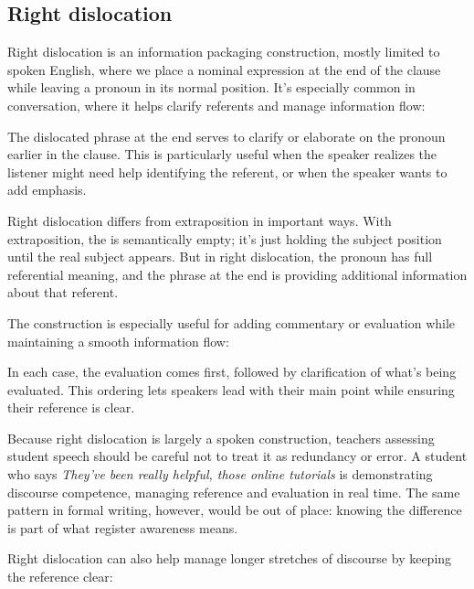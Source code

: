 \subsection{Right dislocation} \label{sec:right-dislocation}

Right dislocation is an information packaging construction, mostly limited to spoken English, where we place a nominal expression at the end of the clause while leaving a pronoun in its normal position. It's especially common in conversation, where it helps clarify referents and manage information flow:

\ea\label{ex:right-dis-basic}
   \z
\z
The dislocated phrase at the end serves to clarify or elaborate on the pronoun earlier in the clause. This is particularly useful when the speaker realizes the listener might need help identifying the referent, or when the speaker wants to add emphasis.

Right dislocation differs from extraposition in important ways. With extraposition, the  is semantically empty; it's just holding the subject position until the real subject appears. But in right dislocation, the pronoun has full referential meaning, and the phrase at the end is providing additional information about that referent.

The construction is especially useful for adding commentary or evaluation while maintaining a smooth information flow:

\ea\label{ex:right-dis-comment}
   \z
\z
In each case, the evaluation comes first, followed by clarification of what's being evaluated. This ordering lets speakers lead with their main point while ensuring their reference is clear.

Because right dislocation is largely a spoken construction, teachers assessing student speech should be careful not to treat it as redundancy or error. A student who says \emph{They've been really helpful, those online tutorials} is demonstrating discourse competence, managing reference and evaluation in real time. The same pattern in formal writing, however, would be out of place: knowing the difference is part of what register awareness means.

Right dislocation can also help manage longer stretches of discourse by keeping the reference clear:

